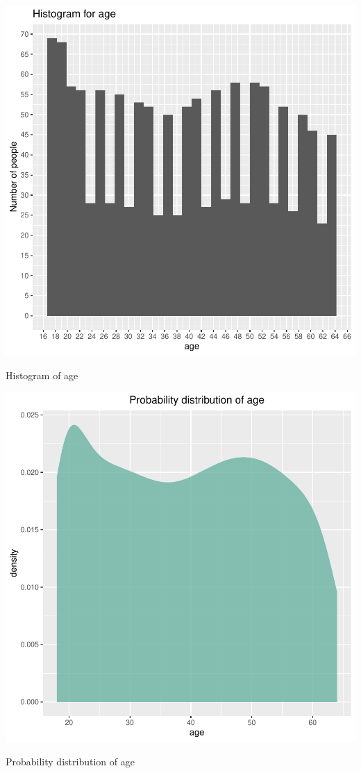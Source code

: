 \documentclass{article}
\begin{document}
\begin{centerfig}
\includegraphics{Untitled-013}
\caption{Histogram of age}
\end{centerfig}

\begin{centerfig}
\includegraphics{Untitled-014}
\caption{Probability distribution of age}
\end{centerfig}
\end{document}
